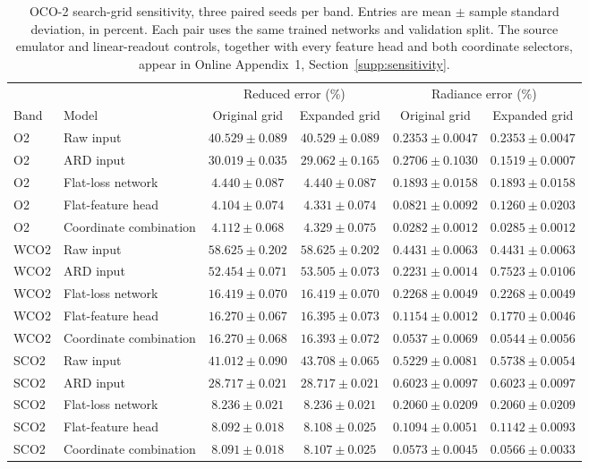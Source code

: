 \documentclass[twoside,11pt]{article}
\begin{document}
\begin{table}[t]
\centering

\begin{adjustbox}{max width=\linewidth}
\begin{tabular}{llcccc}
\toprule
& & \multicolumn{2}{c}{Reduced error (\%)} & \multicolumn{2}{c}{Radiance error (\%)} \\
\cmidrule(lr){3-4}\cmidrule(lr){5-6}
Band & Model & Original grid & Expanded grid & Original grid & Expanded grid \\
\midrule
O2 & Raw input & $40.529\pm0.089$ & $40.529\pm0.089$ & $0.2353\pm0.0047$ & $0.2353\pm0.0047$ \\
O2 & ARD input & $30.019\pm0.035$ & $29.062\pm0.165$ & $0.2706\pm0.1030$ & $0.1519\pm0.0007$ \\
O2 & Flat-loss network & $4.440\pm0.087$ & $4.440\pm0.087$ & $0.1893\pm0.0158$ & $0.1893\pm0.0158$ \\
O2 & Flat-feature head & $4.104\pm0.074$ & $4.331\pm0.074$ & $0.0821\pm0.0092$ & $0.1260\pm0.0203$ \\
O2 & Coordinate combination & $4.112\pm0.068$ & $4.329\pm0.075$ & $0.0282\pm0.0012$ & $0.0285\pm0.0012$ \\
\addlinespace
WCO2 & Raw input & $58.625\pm0.202$ & $58.625\pm0.202$ & $0.4431\pm0.0063$ & $0.4431\pm0.0063$ \\
WCO2 & ARD input & $52.454\pm0.071$ & $53.505\pm0.073$ & $0.2231\pm0.0014$ & $0.7523\pm0.0106$ \\
WCO2 & Flat-loss network & $16.419\pm0.070$ & $16.419\pm0.070$ & $0.2268\pm0.0049$ & $0.2268\pm0.0049$ \\
WCO2 & Flat-feature head & $16.270\pm0.067$ & $16.395\pm0.073$ & $0.1154\pm0.0012$ & $0.1770\pm0.0046$ \\
WCO2 & Coordinate combination & $16.270\pm0.068$ & $16.393\pm0.072$ & $0.0537\pm0.0069$ & $0.0544\pm0.0056$ \\
\addlinespace
SCO2 & Raw input & $41.012\pm0.090$ & $43.708\pm0.065$ & $0.5229\pm0.0081$ & $0.5738\pm0.0054$ \\
SCO2 & ARD input & $28.717\pm0.021$ & $28.717\pm0.021$ & $0.6023\pm0.0097$ & $0.6023\pm0.0097$ \\
SCO2 & Flat-loss network & $8.236\pm0.021$ & $8.236\pm0.021$ & $0.2060\pm0.0209$ & $0.2060\pm0.0209$ \\
SCO2 & Flat-feature head & $8.092\pm0.018$ & $8.108\pm0.025$ & $0.1094\pm0.0051$ & $0.1142\pm0.0093$ \\
SCO2 & Coordinate combination & $8.091\pm0.018$ & $8.107\pm0.025$ & $0.0573\pm0.0045$ & $0.0566\pm0.0033$ \\
\bottomrule
\end{tabular}

\end{adjustbox}
\caption{OCO-2 search-grid sensitivity, three paired seeds per band.
Entries are mean $\pm$ sample standard deviation, in percent. Each pair
uses the same trained networks and validation split. The source emulator
and linear-readout controls, together with every feature head and both
coordinate selectors, appear in Online Appendix~1, Section~\ref{supp:sensitivity}.}
\label{tab:oco-grid-sensitivity}
\end{table}
\end{document}
